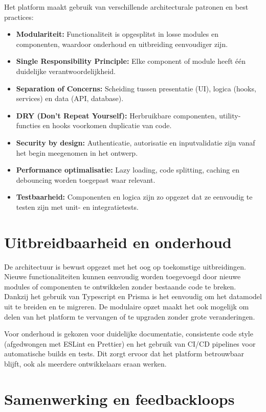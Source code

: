 Het platform maakt gebruik van verschillende architecturale patronen en best practices:
\begin{itemize}
    \item \textbf{Modulariteit:} Functionaliteit is opgesplitst in losse modules en componenten, waardoor onderhoud en uitbreiding eenvoudiger zijn.
    \item \textbf{Single Responsibility Principle:} Elke component of module heeft één duidelijke verantwoordelijkheid.
    \item \textbf{Separation of Concerns:} Scheiding tussen presentatie (UI), logica (hooks, services) en data (API, database).
    \item \textbf{DRY (Don't Repeat Yourself):} Herbruikbare componenten, utility-functies en hooks voorkomen duplicatie van code.
    \item \textbf{Security by design:} Authenticatie, autorisatie en inputvalidatie zijn vanaf het begin meegenomen in het ontwerp.
    \item \textbf{Performance optimalisatie:} Lazy loading, code splitting, caching en debouncing worden toegepast waar relevant.
    \item \textbf{Testbaarheid:} Componenten en logica zijn zo opgezet dat ze eenvoudig te testen zijn met unit- en integratietests.
\end{itemize}

\section{Uitbreidbaarheid en onderhoud}
\label{sec:uitbreidbaarheid}

De architectuur is bewust opgezet met het oog op toekomstige uitbreidingen. Nieuwe functionaliteiten kunnen eenvoudig worden toegevoegd door nieuwe modules of componenten te ontwikkelen zonder bestaande code te breken. Dankzij het gebruik van Typescript en Prisma is het eenvoudig om het datamodel uit te breiden en te migreren. De modulaire opzet maakt het ook mogelijk om delen van het platform te vervangen of te upgraden zonder grote veranderingen.

Voor onderhoud is gekozen voor duidelijke documentatie, consistente code style (afgedwongen met ESLint en Prettier) en het gebruik van CI/CD pipelines voor automatische builds en tests. Dit zorgt ervoor dat het platform betrouwbaar blijft, ook als meerdere ontwikkelaars eraan werken.

\section{Samenwerking en feedbackloops}
\label{sec:samenwerking}

